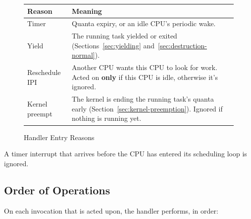 \documentclass[11pt]{article}
\begin{document}
\begin{figure}[H]
	\centering
	\begin{tabularx}{\linewidth}{@{}lX@{}}
		\toprule
		\textbf{Reason} & \textbf{Meaning}                                                                                                               \\
		\midrule
		Timer           & Quanta expiry, or an idle CPU's periodic wake.                                                                                 \\
		Yield           & The running task yielded or exited (Sections~\ref{sec:yielding} and~\ref{sec:destruction-normal}).                             \\
		Reschedule IPI  & Another CPU wants this CPU to look for work. Acted on \textbf{only} if this CPU is idle, otherwise it's ignored.               \\
		Kernel preempt  & The kernel is ending the running task's quanta early (Section~\ref{sec:kernel-preemption}). Ignored if nothing is running yet. \\
		\bottomrule
	\end{tabularx}
	\caption{Handler Entry Reasons}
	\label{fig:handler-reasons}
\end{figure}

A timer interrupt that arrives before the CPU has entered its scheduling loop is ignored.

\subsection{Order of Operations}

On each invocation that is acted upon, the handler performs, in order:
\end{document}
